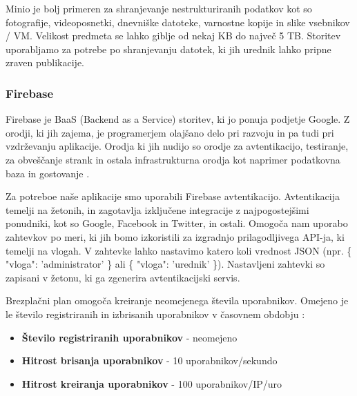 \documentclass[a4paper, 12pt]{book}
\begin{document}
Minio je bolj primeren za shranjevanje nestrukturiranih podatkov kot so fotografije, videoposnetki, dnevniške datoteke, varnostne kopije in slike vsebnikov / VM. Velikost predmeta se lahko giblje od nekaj KB do največ 5 TB. Storitev uporabljamo za potrebe po shranjevanju datotek, ki jih urednik lahko pripne zraven publikacije.



\subsubsection{Firebase}
Firebase je BaaS (Backend as a Service) storitev, ki jo ponuja podjetje Google. Z orodji, ki jih zajema, je programerjem olajšano delo pri razvoju in pa tudi pri vzdrževanju aplikacije. Orodja ki jih nudijo so orodje za avtentikacijo, testiranje, za obveščanje strank in ostala infrastrukturna orodja kot naprimer podatkovna baza in gostovanje \cite{firebase-about}.

Za potreboe naše aplikacije smo uporabili Firebase avtentikacijo. Avtentikacija temelji na žetonih, in zagotavlja izključene integracije z najpogostejšimi ponudniki, kot so Google, Facebook in Twitter, in ostali. Omogoča nam uporabo zahtevkov po meri, ki jih bomo izkoristili za izgradnjo prilagodljivega API-ja, ki temelji na vlogah. V zahtevke lahko nastavimo katero koli vrednost JSON (npr. \{ "vloga": 'administrator' \} ali \{ "vloga": 'urednik' \}). Nastavljeni zahtevki so zapisani v žetonu, ki ga zgenerira avtentikacijski servis.

Brezplačni plan omogoča kreiranje neomejenega števila uporabnikov. Omejeno je le število registriranih in izbrisanih uporabnikov v časovnem obdobju \cite{firebase-limits}:


\begin{itemize}
	\item \textbf{Število registriranih uporabnikov} - neomejeno
	\item \textbf{Hitrost brisanja uporabnikov} - 10 uporabnikov/sekundo
	\item \textbf{Hitrost kreiranja uporabnikov} - 100 uporabnikov/IP/uro
\end{itemize}
\end{document}
